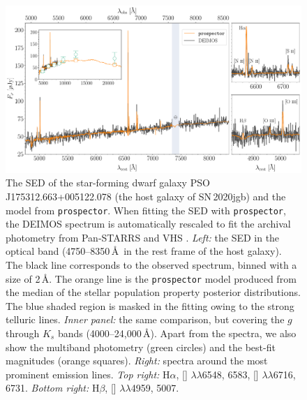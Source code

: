 \documentclass[twocolumn]{aastex631}
\newcommand{\sn}{SN\,2020jgb}
\begin{document}
\begin{figure}
    \centering
    \includegraphics[width=\textwidth]{DEIMOS_20jgb.pdf}
    \caption{The SED of the star-forming dwarf galaxy PSO J175312.663+005122.078 (the host galaxy of \sn) and the model from \texttt{prospector}. When fitting the SED with \texttt{prospector}, the DEIMOS spectrum is automatically rescaled to fit the archival photometry from Pan-STARRS \citep[][$g$, $r$, $i$, $z$, $y$ Kron magnitudes]{PS1_2016} and VHS \citep[][$J$ and $K_s$ Petrosian magnitudes]{VHS_2013}. {\it Left:} the SED in the optical band (4750--8350\,\AA\ in the rest frame of the host galaxy). The black line corresponds to the observed spectrum, binned with a size of 2\,\AA. The orange line is the \texttt{prospector} model produced from the median of the stellar population property posterior distributions. The blue shaded region is masked in the fitting owing to the strong telluric lines. {\it Inner panel:} the same comparison, but covering the $g$ through $K_s$ bands (4000--24,000\,\AA). Apart from the spectra, we also show the multiband photometry (green circles) and the best-fit magnitudes (orange squares). {\it Right:} spectra around the most prominent emission lines. {\it Top right:} H$\alpha$, [] $\lambda\lambda$6548, 6583, [] $\lambda\lambda$6716, 6731. {\it Bottom right:} H$\beta$, [] $\lambda\lambda$4959, 5007.}
    \label{fig:host_spec}
\end{figure}
\end{document}
